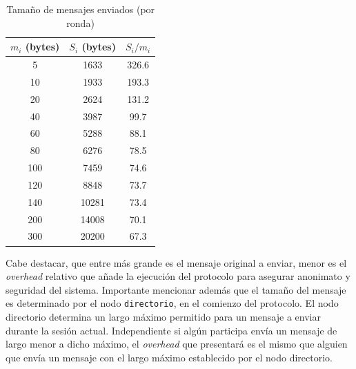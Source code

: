 \begin{table}[h!]
\centering
\begin{tabular}[h!]{|c|c|c|}
\hline
$m_i$ (bytes) & $S_i$ (bytes) & $S_i / m_i$ \\ \hline
5                                   & 1633                               & 326.6       \\ \hline
10                                  & 1933                               & 193.3       \\ \hline
20                                  & 2624                               & 131.2       \\ \hline
40                                  & 3987                               & 99.7        \\ \hline
60                                  & 5288                               & 88.1        \\ \hline
80                                  & 6276                               & 78.5        \\ \hline
100                                 & 7459                               & 74.6        \\ \hline
120                                 & 8848                               & 73.7        \\ \hline
140                                 & 10281                              & 73.4        \\ \hline
200                                 & 14008                              & 70.1        \\ \hline
300                                 & 20200                              & 67.3        \\ \hline
\end{tabular}
\caption{Tamaño de mensajes enviados (por ronda)}
\label{table:message_sizes_table}
\end{table}

Cabe destacar, que entre más grande es el mensaje original a enviar, menor es 
el \emph{overhead} relativo que añade la ejecución del protocolo para asegurar 
anonimato y seguridad del sistema. Importante mencionar además que el tamaño 
del mensaje es determinado por el nodo \texttt{directorio}, en el comienzo del protocolo. 
El nodo directorio determina un largo máximo permitido para un mensaje a enviar 
durante la sesión actual. Independiente si algún participa envía un mensaje de largo menor a dicho 
máximo, el \emph{overhead} que presentará es el mismo que alguien que envía un 
mensaje con el largo máximo establecido por el nodo directorio.


